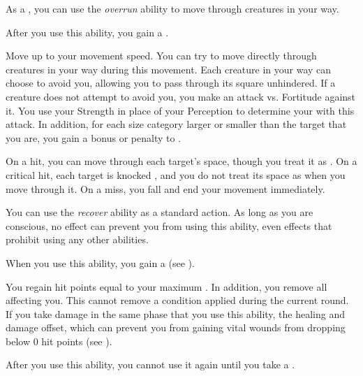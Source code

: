         As a , you can use the \textit{overrun} ability to move through creatures in your way.

        \begin{freeability}{}
            After you use this ability, you gain a .

            Move up to your movement speed.
            You can try to move directly through creatures in your way during this movement.
            Each creature in your way can choose to avoid you, allowing you to pass through its square unhindered.
            If a creature does not attempt to avoid you, you make an attack vs. Fortitude against it.
            You use your Strength in place of your Perception to determine your  with this attack.
            In addition, for each size category larger or smaller than the target that you are, you gain a  bonus or penalty to .

            On a hit, you can move through each target's space, though you treat it as .
            On a critical hit, each target is knocked , and you do not treat its space as  when you move through it.
            On a miss, you fall  and end your movement immediately.
        \end{freeability}

         You can use the \textit{recover} ability as a standard action.
        As long as you are conscious, no effect can prevent you from using this ability, even effects that prohibit using any other abilities.
        \begin{freeability}{}
            When you use this ability, you gain a  (see ).

            You regain hit points equal to your maximum .
            In addition, you remove all  affecting you.
            This cannot remove a condition applied during the current round.
            If you take damage in the same phase that you use this ability, the healing and damage offset, which can prevent you from gaining vital wounds from dropping below 0 hit points (see ).

            After you use this ability, you cannot use it again until you take a .
        \end{freeability}

